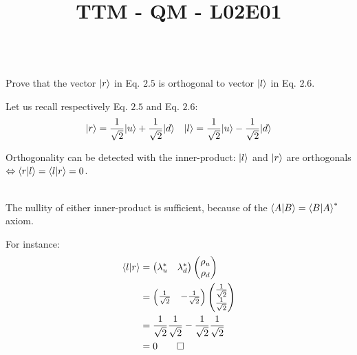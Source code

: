 \documentclass[solutions.tex]{subfiles}
\title{TTM - QM - L02E01}
\begin{document}
\maketitle
\begin{exercise}\ \\
Prove that the vector $|r\rangle$ in Eq. $2.5$ is orthogonal to vector
$|l\rangle$ in Eq. $2.6$.
\end{exercise}
\hrr

Let us recall respectively Eq. $2.5$ and Eq. $2.6$:
\begin{align*}
|r\rangle &= \frac{1}{\sqrt2}|u\rangle + \frac{1}{\sqrt2}|d\rangle &
|l\rangle &= \frac{1}{\sqrt2}|u\rangle - \frac{1}{\sqrt2}|d\rangle \\
\end{align*}

Orthogonality can be detected with the inner-product: $|l\rangle$
and $|r\rangle$ are orthogonals $\Leftrightarrow \left\langle r \middle| l \right\rangle =
\left\langle l \middle| r \right\rangle = 0$.

\begin{remark}\ \\
The nullity of either inner-product is sufficient, because
of the $\left\langle A \middle| B \right\rangle = \left\langle B \middle| A \right\rangle^*$ axiom.
\end{remark}

For instance:
\begin{align*}
\left\langle l \middle| r \right\rangle & =
\begin{pmatrix}
	\lambda_u^* & \lambda_d^* \\
\end{pmatrix}
\begin{pmatrix}
	\rho_u \\
	\rho_d \\
\end{pmatrix} \\
~ & = \begin{pmatrix}
	\frac1{\sqrt2} & -\frac1{\sqrt2} \\
\end{pmatrix}
\begin{pmatrix}
	\frac1{\sqrt2} \\
	\frac1{\sqrt2} \\
\end{pmatrix} \\
~ & = \frac1{\sqrt2}\frac1{\sqrt2}-\frac1{\sqrt2}\frac1{\sqrt2} \\
~ & = 0 \qed\\
\end{align*}
\end{document}

